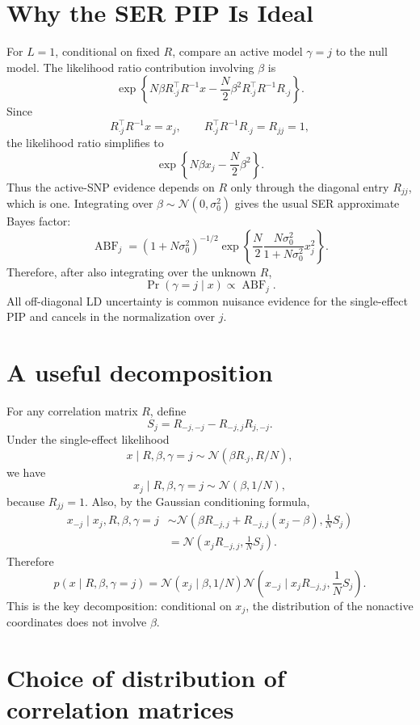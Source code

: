 \documentclass[11pt]{article}
\newcommand{\Normal}{\mathcal N}
\begin{document}
\section{Why the SER PIP Is Ideal}

For \(L=1\), conditional on fixed \(R\), compare an active model
\(\gamma=j\) to the null model. The likelihood ratio contribution involving
\(\beta\) is
\[
\exp\left\{
N\beta R_{\cdot j}^{\top}R^{-1}x
-
\frac{N}{2}\beta^2 R_{\cdot j}^{\top}R^{-1}R_{\cdot j}
\right\}.
\]
Since
\[
R_{\cdot j}^{\top}R^{-1}x=x_j,
\qquad
R_{\cdot j}^{\top}R^{-1}R_{\cdot j}=R_{jj}=1,
\]
the likelihood ratio simplifies to
\[
\exp\left\{
N\beta x_j-\frac{N}{2}\beta^2
\right\}.
\]
Thus the active-SNP evidence depends on \(R\) only through the diagonal entry
\(R_{jj}\), which is one. Integrating over
\(\beta\sim\Normal(0,\sigma_0^2)\) gives the usual SER approximate Bayes
factor:
\[
\operatorname{ABF}_j
=
(1+N\sigma_0^2)^{-1/2}
\exp\left\{
\frac{N}{2}
\frac{N\sigma_0^2}{1+N\sigma_0^2}
x_j^2
\right\}.
\]
Therefore, after also integrating over the unknown \(R\),
\[
\Pr(\gamma=j\mid x)
\propto
\operatorname{ABF}_j.
\]
All off-diagonal LD uncertainty is common nuisance evidence for the
single-effect PIP and cancels in the normalization over \(j\).

\section{A useful decomposition}

For any correlation matrix \(R\), define
\[
S_j=R_{-j,-j}-R_{-j,j}R_{j,-j}.
\]
Under the single-effect likelihood
\[
x\mid R,\beta,\gamma=j
\sim
\Normal(\beta R_{\cdot j},R/N),
\]
we have
\[
x_j\mid R,\beta,\gamma=j
\sim
\Normal(\beta,1/N),
\]
because \(R_{jj}=1\). Also, by the Gaussian conditioning formula,
\begin{align*}
x_{-j}\mid x_j,R,\beta,\gamma=j
&\sim
\Normal\left(
\beta R_{-j,j}
+
R_{-j,j}(x_j-\beta),
\frac{1}{N}S_j
\right)\\
&=
\Normal\left(
x_jR_{-j,j},
\frac{1}{N}S_j
\right).
\end{align*}
Therefore
\begin{equation}
p(x\mid R,\beta,\gamma=j)
=
\Normal(x_j\mid \beta,1/N)
\Normal\left(x_{-j}\mid x_jR_{-j,j},\frac{1}{N}S_j\right).
\end{equation}
This is the key decomposition: conditional on \(x_j\), the distribution of
the nonactive coordinates does not involve \(\beta\).

\section{Choice of distribution of correlation matrices}
\end{document}
